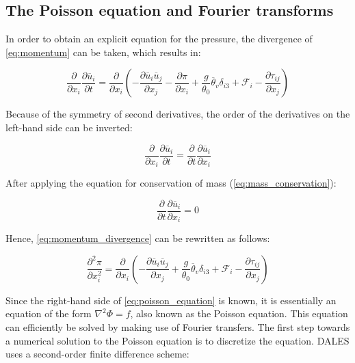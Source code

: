 \subsection{The Poisson equation and Fourier transforms} \label{sec:dales_poisson}


In order to obtain an explicit equation for the pressure, the divergence of \autoref{eq:momentum} can be taken, which results in:

\begin{equation}
    \frac{\partial}{\partial x_i}\frac{\partial \overline{u}_i}{\partial t} = \frac{\partial}{\partial x_i} \left( - \frac{\partial \overline{u}_i \overline{u}_j}{\partial x_j} - \frac{\partial \pi}{\partial x_i} + \frac{g}{\theta_0}\overline{\theta}_v \delta_{i3} + \mathcal{F}_i - \frac{\partial \tau_{ij}}{\partial x_j} \right) \label{eq:momentum_divergence}
\end{equation}

\noindent Because of the symmetry of second derivatives, the order of the derivatives on the left-hand side can be inverted:

\begin{equation*}
    \frac{\partial}{\partial x_i}\frac{\partial \overline{u}_i}{\partial t} = \frac{\partial}{\partial t}\frac{\partial \overline{u}_i}{\partial x_i}
\end{equation*}

\noindent After applying the equation for conservation of mass (\autoref{eq:mass_conservation}):

\begin{equation}
    \frac{\partial}{\partial t} \frac{\partial \overline{u}_i}{\partial x_i} = 0
\end{equation}

\noindent Hence, \autoref{eq:momentum_divergence} can be rewritten as follows:

\begin{equation}
    \frac{\partial^2 \pi}{\partial x_i^2} = \frac{\partial}{\partial x_i} \left( - \frac{\partial \overline{u}_i \overline{u}_j}{\partial x_j} + \frac{g}{\theta_0}\overline{\theta}_v \delta_{i3} + \mathcal{F}_i - \frac{\partial \tau_{ij}}{\partial x_j} \right)
    \label{eq:poisson_equation}
\end{equation}

\noindent Since the right-hand side of \autoref{eq:poisson_equation} is known, it is essentially an equation of the form $\nabla^2 \Phi = f$, also known as the Poisson equation. This equation can efficiently be solved by making use of Fourier transfers. The first step towards a numerical solution to the Poisson equation is to discretize the equation. DALES uses a second-order finite difference scheme:

